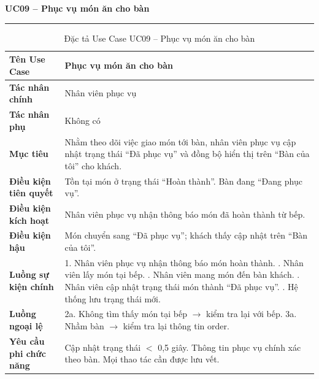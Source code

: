 ﻿\documentclass[../DoAn.tex]{subfiles}
\newcommand{\UCtitle}[1]{%
    \vspace{0.5em}
    {\large\bfseries #1}\\[-0.5em]
    \rule{\textwidth}{0.5pt}
    \vspace{0.3em}
}
\begin{document}
\begin{table}[H]
\UCtitle{UC09 – Phục vụ món ăn cho bàn}
\centering
\begin{tabular}{|p{4cm}|p{10.2cm}|}
\hline
\textbf{Tên Use Case} & Phục vụ món ăn cho bàn \\ \hline
\textbf{Tác nhân chính} & Nhân viên phục vụ \\ \hline
\textbf{Tác nhân phụ} & Không có \\ \hline
\textbf{Mục tiêu} &
Nhằm theo dõi việc giao món tới bàn, nhân viên phục vụ cập nhật trạng thái ``Đã phục vụ'' và đồng bộ hiển thị trên ``Bàn của tôi'' cho khách.
\\ \hline
\textbf{Điều kiện tiên quyết} &
Tồn tại món ở trạng thái ``Hoàn thành''. Bàn đang ``Đang phục vụ''.
\\ \hline
\textbf{Điều kiện kích hoạt} &
Nhân viên phục vụ nhận thông báo món đã hoàn thành từ bếp.
\\ \hline
\textbf{Điều kiện hậu} &
Món chuyển sang ``Đã phục vụ''; khách thấy cập nhật trên ``Bàn của tôi''.
\\ \hline
\textbf{Luồng sự kiện chính} &
1. Nhân viên phục vụ nhận thông báo món hoàn thành. \newline
2. Nhân viên lấy món tại bếp. \newline
3. Nhân viên mang món đến bàn khách. \newline
4. Nhân viên cập nhật trạng thái món thành ``Đã phục vụ''. \newline
5. Hệ thống lưu trạng thái mới.
\\ \hline
\textbf{Luồng ngoại lệ} &
2a. Không tìm thấy món tại bếp $\rightarrow$ kiểm tra lại với bếp. \newline
3a. Nhầm bàn $\rightarrow$ kiểm tra lại thông tin order.
\\ \hline
\textbf{Yêu cầu phi chức năng} &
Cập nhật trạng thái $<$ 0,5 giây. Thông tin phục vụ chính xác theo bàn. Mọi thao tác cần được lưu vết.
\\ \hline
\end{tabular}
\caption{Đặc tả Use Case UC09 – Phục vụ món ăn cho bàn}
\end{table}
\end{document}

